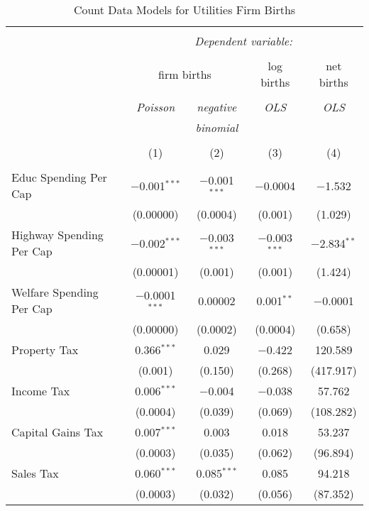 
\begin{table}[!htbp] \centering 
  \caption{Count Data Models for Utilities Firm Births} 
  \label{} 
\begin{tabular}{@{\extracolsep{5pt}}lcccc} 
\\[-1.8ex]\hline 
\hline \\[-1.8ex] 
 & \multicolumn{4}{c}{\textit{Dependent variable:}} \\ 
\cline{2-5} 
\\[-1.8ex] & \multicolumn{2}{c}{firm births} & log births & net births \\ 
\\[-1.8ex] & \textit{Poisson} & \textit{negative} & \textit{OLS} & \textit{OLS} \\ 
 & \textit{} & \textit{binomial} & \textit{} & \textit{} \\ 
\\[-1.8ex] & (1) & (2) & (3) & (4)\\ 
\hline \\[-1.8ex] 
 Educ Spending Per Cap & $-$0.001$^{***}$ & $-$0.001$^{***}$ & $-$0.0004 & $-$1.532 \\ 
  & (0.00000) & (0.0004) & (0.001) & (1.029) \\ 
  Highway Spending Per Cap  & $-$0.002$^{***}$ & $-$0.003$^{***}$ & $-$0.003$^{***}$ & $-$2.834$^{**}$ \\ 
  & (0.00001) & (0.001) & (0.001) & (1.424) \\ 
  Welfare Spending Per Cap  & $-$0.0001$^{***}$ & 0.00002 & 0.001$^{**}$ & $-$0.0001 \\ 
  & (0.00000) & (0.0002) & (0.0004) & (0.658) \\ 
  Property Tax & 0.366$^{***}$ & 0.029 & $-$0.422 & 120.589 \\ 
  & (0.001) & (0.150) & (0.268) & (417.917) \\ 
  Income Tax & 0.006$^{***}$ & $-$0.004 & $-$0.038 & 57.762 \\ 
  & (0.0004) & (0.039) & (0.069) & (108.282) \\ 
  Capital Gains Tax & 0.007$^{***}$ & 0.003 & 0.018 & 53.237 \\ 
  & (0.0003) & (0.035) & (0.062) & (96.894) \\ 
  Sales Tax & 0.060$^{***}$ & 0.085$^{***}$ & 0.085 & 94.218 \\ 
  & (0.0003) & (0.032) & (0.056) & (87.352) \\ 

\end{tabular}
\end{table}

